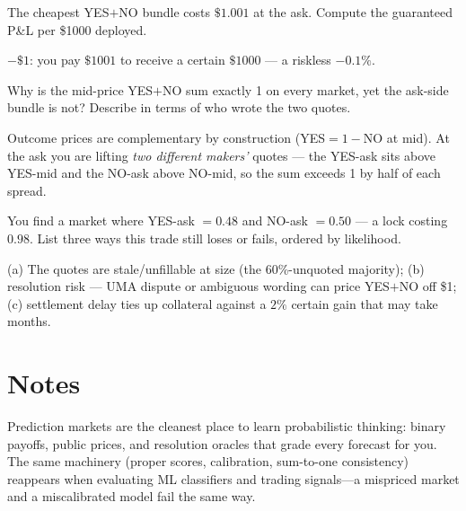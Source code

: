 \begin{exercise}[easy]
The cheapest YES$+$NO bundle costs $\$1.001$ at the ask. Compute
the guaranteed P\&L per \$1000 deployed.
\end{exercise}
\begin{solution}
$-\$1$: you pay $\$1001$ to receive a certain $\$1000$ --- a
riskless $-0.1\%$.
\end{solution}
\begin{exercise}[medium]
Why is the mid-price YES$+$NO sum exactly 1 on every market, yet
the ask-side bundle is not? Describe in terms of who wrote the
two quotes.
\end{exercise}
\begin{solution}
Outcome prices are complementary by construction (YES$=1-$NO at
mid). At the ask you are lifting \emph{two different makers'}
quotes --- the YES-ask sits above YES-mid and the NO-ask above
NO-mid, so the sum exceeds 1 by half of each spread.
\end{solution}
\begin{exercise}[hard]
You find a market where YES-ask $=0.48$ and NO-ask $=0.50$ ---
a lock costing $0.98$. List three ways this trade still loses or
fails, ordered by likelihood.
\end{exercise}
\begin{solution}
(a) The quotes are stale/unfillable at size (the 60\%-unquoted
majority); (b) resolution risk --- UMA dispute or ambiguous
wording can price YES$+$NO off \$1; (c) settlement delay ties up
collateral against a $2\%$ certain gain that may take months.
\end{solution}

\section*{Notes}
Prediction markets are the cleanest place to learn probabilistic thinking: binary payoffs,
public prices, and resolution oracles that grade every forecast for you. The same machinery
(proper scores, calibration, sum-to-one consistency) reappears when evaluating ML classifiers
and trading signals---a mispriced market and a miscalibrated model fail the same way.


